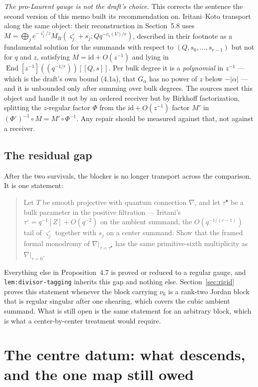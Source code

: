 \documentclass[11pt]{article}
\theoremstyle{definition}
\theoremstyle{remark}
\begin{document}
\emph{The pro-Laurent gauge is not the draft's choice.} This corrects the
sentence the second version of this memo built its recommendation on.
Iritani--Koto transport along the same object: their reconstruction in
Section~5.8 uses
$M=\bigoplus_je^{-\varsigma_j^\circ/z}M_B(\varsigma_j^\circ+s_j;Qq^{-c_1(V)/r})$,
described in their footnote as a fundamental solution for the summands with
respect to $(Q,s_0,\dots,s_{r-1})$ but not for $q$ and $z$, satisfying
$M=\mathrm{id}+O(z^{-1})$ and lying in
$\operatorname{End}[z^{-1}](\!(q^{-1/r})\!)[[Q,s]]$. Per bulk degree it is a
\emph{polynomial} in $z^{-1}$ --- which is the draft's own bound (4.1a), that
$G_\alpha$ has no power of $z$ below $-|\alpha|$ --- and it is unbounded only
after summing over bulk degrees. The sources meet this object and handle it not
by an ordered receiver but by Birkhoff factorization, splitting the $z$-regular
factor $\Phi$ from the $\mathrm{id}+O(z^{-1})$ factor $M'$ in
$(\Phi^\circ)^{-1}\circ M=M'\circ\Phi^{-1}$. Any repair should be measured
against that, not against a receiver.

\subsection*{The residual gap}

After the two survivals, the blocker is no longer transport across the
comparison. It is one statement:

\begin{quote}
  Let $T$ be smooth projective with quantum connection $\nabla$, and let
  $\tau^\bullet$ be a bulk parameter in the positive filtration --- Iritani's
  $\tau^\circ=q^{-1}[Z]+O(q^{-2})$ on the ambient summand, the
  $O(q^{-1/(c-1)})$ tail of $\varsigma_j^\circ$ together with $s_j$ on a center
  summand. Show that the framed formal monodromy of $\nabla|_{\tau=\tau^\bullet}$
  has the same primitive-sixth multiplicity as $\nabla|_{\tau=0}$.
\end{quote}

Everything else in Proposition~4.7 is proved or reduced to a regular gauge, and
\texttt{lem:divisor-tagging} inherits this gap and nothing else.
Section~\ref{sec:rigid} proves this statement whenever the block carrying
$\nu_6$ is a rank-two Jordan block that is regular singular after one shearing,
which covers the cubic ambient summand. What is still open is the same
statement for an arbitrary block, which is what a center-by-center treatment
would require.


\section{The centre datum: what descends, and the one map still owed}
\label{sec:base-change}
\end{document}
